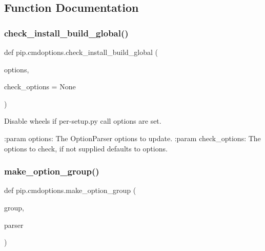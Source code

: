\subsection{Function Documentation}
\mbox{\label{namespacepip_1_1cmdoptions_afcf275e5a138ede6ea6a569ff211aded}} 
\subsubsection{\texorpdfstring{check\+\_\+install\+\_\+build\+\_\+global()}{check\_install\_build\_global()}}
{\footnotesize\ttfamily def pip.\+cmdoptions.\+check\+\_\+install\+\_\+build\+\_\+global (\begin{DoxyParamCaption}\item[{}]{options,  }\item[{}]{check\+\_\+options = {\ttfamily None} }\end{DoxyParamCaption})}

\begin{DoxyVerb}Disable wheels if per-setup.py call options are set.

:param options: The OptionParser options to update.
:param check_options: The options to check, if not supplied defaults to
    options.
\end{DoxyVerb}
 \mbox{\label{namespacepip_1_1cmdoptions_a4933ebcd6ce60db8d069607901312dd7}} 
\subsubsection{\texorpdfstring{make\+\_\+option\+\_\+group()}{make\_option\_group()}}
{\footnotesize\ttfamily def pip.\+cmdoptions.\+make\+\_\+option\+\_\+group (\begin{DoxyParamCaption}\item[{}]{group,  }\item[{}]{parser }\end{DoxyParamCaption})}

